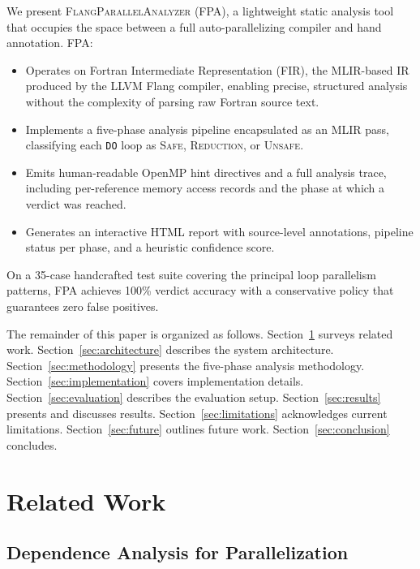 \documentclass[conference]{IEEEtran}
\begin{document}
We present \textsc{FlangParallelAnalyzer} (FPA), a lightweight static
analysis tool that occupies the space between a full auto-parallelizing
compiler and hand annotation.  FPA:
\begin{itemize}
  \item Operates on Fortran Intermediate Representation (FIR), the
        MLIR-based IR produced by the LLVM Flang compiler, enabling
        precise, structured analysis without the complexity of parsing
        raw Fortran source text.
  \item Implements a five-phase analysis pipeline encapsulated as an
        MLIR pass, classifying each \texttt{DO} loop as \textsc{Safe},
        \textsc{Reduction}, or \textsc{Unsafe}.
  \item Emits human-readable OpenMP hint directives and a full
        analysis trace, including per-reference memory access records
        and the phase at which a verdict was reached.
  \item Generates an interactive HTML report with source-level
        annotations, pipeline status per phase, and a heuristic
        confidence score.
\end{itemize}

On a 35-case handcrafted test suite covering the principal loop
parallelism patterns, FPA achieves 100\% verdict accuracy with a
conservative policy that guarantees zero false positives.

The remainder of this paper is organized as follows.
Section~\ref{sec:related} surveys related work.
Section~\ref{sec:architecture} describes the system architecture.
Section~\ref{sec:methodology} presents the five-phase analysis
methodology.
Section~\ref{sec:implementation} covers implementation details.
Section~\ref{sec:evaluation} describes the evaluation setup.
Section~\ref{sec:results} presents and discusses results.
Section~\ref{sec:limitations} acknowledges current limitations.
Section~\ref{sec:future} outlines future work.
Section~\ref{sec:conclusion} concludes.

\section{Related Work}
\label{sec:related}

\subsection{Dependence Analysis for Parallelization}
\end{document}
